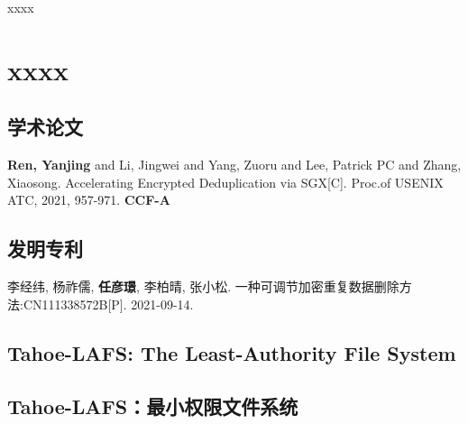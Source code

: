 \documentclass[master]{thesis-uestc}
\begin{document}
\thesisacknowledgement

xxxx %


\thesisappendix
\chapter{xxxx} %

\begin{thesistheaccomplish}
    \section{学术论文}
     \textbf{Ren, Yanjing} and Li, Jingwei and Yang, Zuoru and Lee, Patrick PC and Zhang, Xiaosong. Accelerating Encrypted Deduplication via SGX[C]. Proc.of USENIX ATC, 2021, 957-971. \textbf{CCF-A}
    \section{发明专利}
     李经纬, 杨祚儒, \textbf{任彦璟}, 李柏晴, 张小松. 一种可调节加密重复数据删除方法:CN111338572B[P]. 2021-09-14.
\end{thesistheaccomplish}

\thesistranslationoriginal
\section{Tahoe-LAFS: The Least-Authority File System}

\thesistranslationchinese
\section{Tahoe-LAFS：最小权限文件系统}
\end{document}
